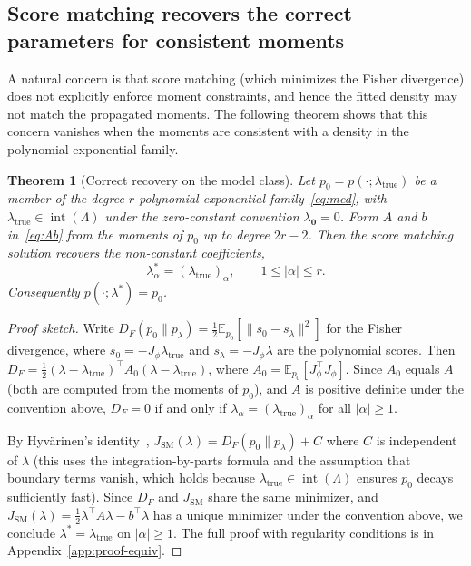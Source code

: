 \documentclass{article}
\newcommand{\E}{\mathbb{E}}
\newtheorem{theorem}{Theorem}
\theoremstyle{definition}
\begin{document}
\subsection{Score matching recovers the correct parameters for consistent moments}

A natural concern is that score matching (which minimizes the Fisher divergence)
does not explicitly enforce moment constraints, and hence
the fitted density may not match the propagated moments.
The following theorem shows that this concern vanishes when the
moments are consistent with a density in the polynomial
exponential family.

\begin{theorem}[Correct recovery on the model class]\label{thm:sm-maxent}
Let $p_0=p(\cdot;\lambda_{\mathrm{true}})$ be a member of the degree-$r$ polynomial
exponential family~\eqref{eq:med}, with
$\lambda_{\mathrm{true}} \in \operatorname{int}(\Lambda)$ under the
zero-constant convention $\lambda_{\mathbf{0}}=0$.
Form $A$ and $b$ in~\eqref{eq:Ab} from the moments of $p_0$ up to degree
$2r{-}2$. Then the score matching solution recovers the non-constant
coefficients,
\begin{equation}
    \lambda^*_\alpha = (\lambda_{\mathrm{true}})_\alpha,
    \qquad 1 \le |\alpha| \le r.
\end{equation}
Consequently $p(\cdot;\lambda^*)=p_0$.
\end{theorem}

\begin{proof}[Proof sketch]
Write $D_F(p_0 \| p_\lambda) = \frac{1}{2}\E_{p_0}[\|s_0 - s_\lambda\|^2]$
for the Fisher divergence, where $s_0 = -J_\phi \lambda_{\mathrm{true}}$
and $s_\lambda = -J_\phi \lambda$ are the polynomial scores.
Then $D_F = \frac{1}{2}(\lambda{-}\lambda_{\mathrm{true}})^\top A_0 (\lambda{-}\lambda_{\mathrm{true}})$,
where $A_0 = \E_{p_0}[J_\phi^\top J_\phi]$.
Since $A_0$ equals $A$ (both are computed from the moments of $p_0$),
and $A$ is positive definite under the convention above,
$D_F = 0$ if and only if $\lambda_\alpha = (\lambda_{\mathrm{true}})_\alpha$
for all $|\alpha| \ge 1$.

By Hyv\"arinen's identity~\cite{hyvarinen2005},
$J_{\mathrm{SM}}(\lambda) = D_F(p_0 \| p_\lambda) + C$
where $C$ is independent of $\lambda$
(this uses the integration-by-parts formula and the
assumption that boundary terms vanish, which holds because
$\lambda_{\mathrm{true}} \in \operatorname{int}(\Lambda)$ ensures
$p_0$ decays sufficiently fast).
Since $D_F$ and $J_{\mathrm{SM}}$ share the same minimizer,
and $J_{\mathrm{SM}}(\lambda) = \frac{1}{2}\lambda^\top A\lambda - b^\top\lambda$
has a unique minimizer under the convention above,
we conclude $\lambda^* = \lambda_{\mathrm{true}}$ on $|\alpha| \ge 1$.
The full proof with regularity conditions is in
Appendix~\ref{app:proof-equiv}.
\end{proof}
\end{document}
